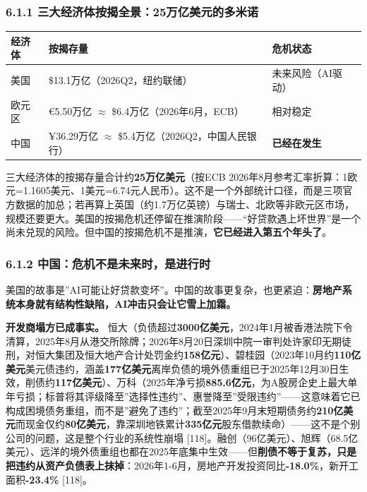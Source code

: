 \documentclass[11pt,a4paper]{ctexart}
\begin{document}
\subsubsection{6.1.1 三大经济体按揭全景：25万亿美元的多米诺}

\begin{center}

\begin{tabularx}{\textwidth}{lXX}
\toprule
经济体 & 按揭存量 & 危机状态 \\
\midrule
美国 & \$13.1万亿（2026Q2，纽约联储） & 未来风险（AI驱动） \\
欧元区 & €5.50万亿 $\approx$ \$6.4万亿（2026年6月，ECB） & 相对稳定 \\
中国 & ¥36.29万亿 $\approx$ \$5.4万亿（2026Q2，中国人民银行） & \textbf{已经在发生} \\
\bottomrule
\end{tabularx}
\end{center}

三大经济体的按揭存量合计约\textbf{25万亿美元}（按ECB 2026年8月参考汇率折算：1欧元=1.1605美元、1美元=6.74元人民币）。这不是一个外部统计口径，而是三项官方数据的加总；若再算上英国（约1.7万亿英镑）与瑞士、北欧等非欧元区市场，规模还要更大。美国的按揭危机还停留在推演阶段——“好贷款遇上坏世界”是一个尚未兑现的风险。但中国的按揭危机不是推演，\textbf{它已经进入第五个年头了}。

\subsubsection{6.1.2 中国：危机不是未来时，是进行时}

美国的故事是”AI可能让好贷款变坏”。中国的故事更复杂，也更紧迫：\textbf{房地产系统本身就有结构性缺陷，AI冲击只会让它雪上加霜。}

\textbf{开发商塌方已成事实。} 恒大（负债超过\textbf{3000亿美元}，2024年1月被香港法院下令清算，2025年8月从港交所除牌；2026年8月20日深圳中院一审判处许家印无期徒刑，对恒大集团及恒大地产合计处罚金约\textbf{158亿元}）、碧桂园（2023年10月约\textbf{110亿美元}美元债违约，涵盖\textbf{177亿美元}离岸负债的境外债重组已于2025年12月30日生效，削债约\textbf{117亿美元}）、万科（2025年净亏损\textbf{885.6亿元}，为A股房企史上最大单年亏损；标普将其评级降至”选择性违约”、惠誉降至”受限违约”——这意味着它已构成困境债务重组，而不是”避免了违约”；截至2025年9月末短期债务约\textbf{210亿美元}而现金仅约\textbf{80亿美元}，靠深圳地铁累计\textbf{335亿元}股东借款续命）——这不是个别公司的问题，这是整个行业的系统性崩塌 [118]。融创（96亿美元）、旭辉（68.5亿美元）、远洋的境外债重组也都在2025年底集中生效——但\textbf{削债不等于复苏，只是把违约从资产负债表上抹掉}：2026年1-6月，房地产开发投资同比\textbf{-18.0\%}，新开工面积\textbf{-23.4\%}{} [118]。
\end{document}
